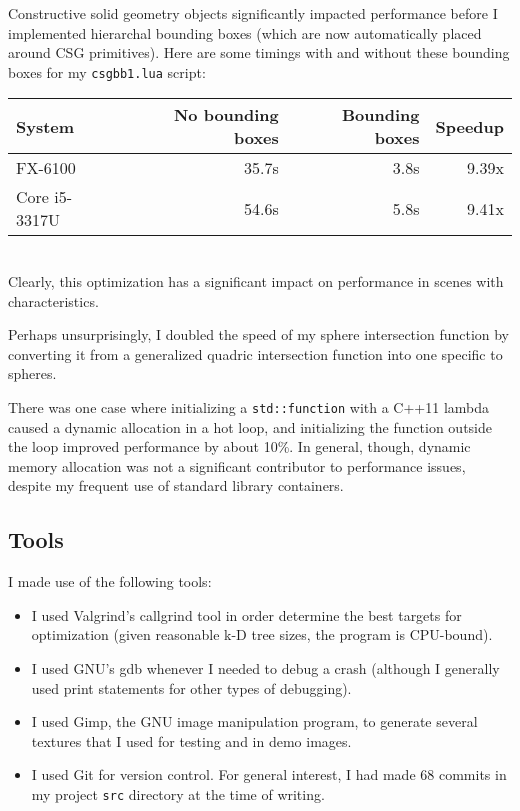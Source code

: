 \documentclass{article}
\begin{document}
Constructive solid geometry objects significantly impacted performance before I
implemented hierarchal bounding boxes (which are now automatically placed around
CSG primitives). Here are some timings with and without these bounding boxes for
my {\tt csgbb1.lua} script: \\

\begin{tabular}{|l|r|r|r|} \hline
 System & No bounding boxes & Bounding boxes & Speedup \\\hline
 FX-6100 & 35.7s & 3.8s & 9.39x \\\hline
 Core i5-3317U & 54.6s & 5.8s & 9.41x \\\hline
\end{tabular} \\

Clearly, this optimization has a significant impact on performance in scenes
with characteristics.

Perhaps unsurprisingly, I doubled the speed of my sphere intersection function
by converting it from a generalized quadric intersection function into one
specific to spheres.

There was one case where initializing a {\tt std::function} with a C++11
lambda caused a dynamic allocation in a hot loop, and initializing
the function outside the loop improved performance by about 10\%. In general,
though, dynamic memory allocation was not a significant contributor to
performance issues, despite my frequent use of standard library containers.

\subsection{Tools}

I made use of the following tools:

\begin{itemize}
  \item I used Valgrind's callgrind tool in order determine the best targets for
optimization (given reasonable k-D tree sizes, the program is CPU-bound).

  \item I used GNU's gdb whenever I needed to debug a crash (although I generally used
print statements for other types of debugging).

  \item I used Gimp, the GNU image manipulation program, to generate several textures
that I used for testing and in demo images.

  \item I used Git for version control. For general interest, I had made $68$ commits
in my project {\tt src} directory at the time of writing.
\end{itemize}
\end{document}
